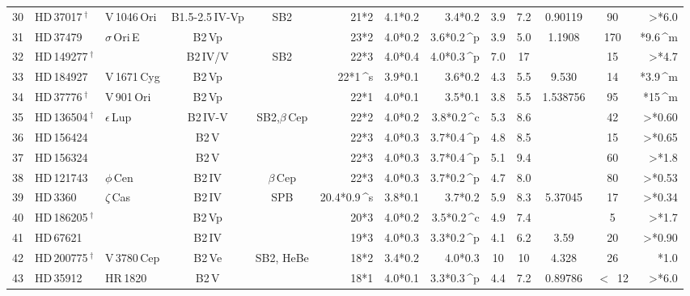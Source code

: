 \begin{longtable}{l l l c c D{*}{\,\pm\,}{4,4} D{*}{\,\pm\,}{4,4} D{*}{\,\pm\,}{6,6} c c c c D{*}{\,}{2,4} }
30 & HD\,37017\,$^\dagger$ & V\,1046\,Ori & B1.5-2.5\,IV-Vp & SB2 &21*2 & 4.1*0.2 & 3.4*0.2 & 3.9 & 7.2 & 0.90119 & 90 & >*6.0 \\ 

31 & HD\,37479 & $\sigma$\,Ori\,E & B2\,Vp &  &23*2 & 4.0*0.2 & 3.6*0.2\,^{p} & 3.9 & 5.0 & 1.1908 & 170 & *9.6\,^m \\ 

32 & HD\,149277\,$^\dagger$ &   & B2\,IV/V & SB2 &22*3 & 4.0*0.4 & 4.0*0.3\,^{p} & 7.0 & 17 &   & 15 & >*4.7 \\ 

33 & HD\,184927 & V\,1671\,Cyg & B2\,Vp &  &22*1\,^{s} & 3.9*0.1 & 3.6*0.2 & 4.3 & 5.5 & 9.530 & 14 & *3.9\,^m \\ 

34 & HD\,37776\,$^\dagger$ & V\,901\,Ori & B2\,Vp &  &22*1 & 4.0*0.1 & 3.5*0.1 & 3.8 & 5.5 & 1.538756 & 95 & *15\,^m \\ 

35 & HD\,136504\,$^\dagger$ & $\epsilon$\,Lup & B2\,IV-V & SB2,$\beta$\,Cep &22*2 & 4.0*0.2 & 3.8*0.2\,^{c} & 5.3 & 8.6 &   & 42 & >*0.60 \\ 

36 & HD\,156424 &   & B2\,V &  &22*3 & 4.0*0.3 & 3.7*0.4\,^{p} & 4.8 & 8.5 &   & 15 & >*0.65 \\ 

37 & HD\,156324 &   & B2\,V &  &22*3 & 4.0*0.3 & 3.7*0.4\,^{p} & 5.1 & 9.4 &   & 60 & >*1.8 \\ 

38 & HD\,121743 & $\phi$\,Cen & B2\,IV & $\beta$\,Cep &22*3 & 4.0*0.3 & 3.7*0.2\,^{p} & 4.7 & 8.0 &   & 80 & >*0.53 \\ 

39 & HD\,3360 & $\zeta$\,Cas & B2\,IV & SPB &20.4*0.9\,^{s} & 3.8*0.1 & 3.7*0.2 & 5.9 & 8.3 & 5.37045 & 17 & >*0.34 \\ 

40 & HD\,186205\,$^\dagger$ &   & B2\,Vp &  &20*3 & 4.0*0.2 & 3.5*0.2\,^{c} & 4.9 & 7.4 &   & 5 & >*1.7 \\ 

41 & HD\,67621 &   & B2\,IV &  &19*3 & 4.0*0.3 & 3.3*0.2\,^{p} & 4.1 & 6.2 & 3.59 & 20 & >*0.90 \\ 

42 & HD\,200775\,$^\dagger$ & V\,3780\,Cep & B2\,Ve & SB2, HeBe &18*2 & 3.4*0.2 & 4.0*0.3 & 10 & 10 & 4.328 & 26 & *1.0 \\ 

43 & HD\,35912 & HR\,1820 & B2\,V &  &18*1 & 4.0*0.1 & 3.3*0.3\,^{p} & 4.4 & 7.2 & 0.89786 & $<$~12 & >*6.0 \\ 


\end{longtable}

